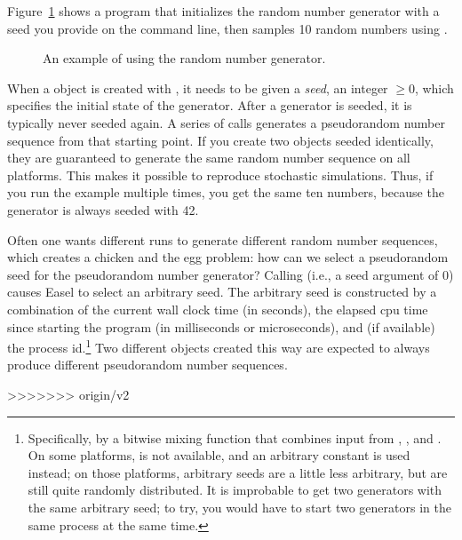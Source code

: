 Figure~\ref{fig:random_example} shows a program that initializes the
random number generator with a seed you provide on the command line,
then samples 10 random numbers using .

\begin{figure}

\caption{An example of using the random number generator.}
\label{fig:random_example}
\end{figure}

When a  object is created with
, it needs to be given a \emph{seed},
an integer $\geq 0$, which specifies the initial state of the
generator. After a generator is seeded, it is typically never seeded
again. A series of  calls generates a
pseudorandom number sequence from that starting point. If you create
two  objects seeded identically, they are
guaranteed to generate the same random number sequence on all
platforms. This makes it possible to reproduce stochastic simulations.
Thus, if you run the example multiple times, you get the same ten
numbers, because the generator is always seeded with 42.

Often one wants different runs to generate different random number
sequences, which creates a chicken and the egg problem: how can we
select a pseudorandom seed for the pseudorandom number generator?
Calling  (i.e., a seed argument of
0) causes Easel to select an arbitrary seed. The arbitrary seed is
constructed by a combination of the current wall clock time (in
seconds), the elapsed cpu time since starting the program (in
milliseconds or microseconds), and (if available) the process
id.\footnote{Specifically, by a bitwise mixing function that combines
  input from , , and . On
  some platforms,  is not available, and an arbitrary
  constant is used instead; on those platforms, arbitrary seeds are a
  little less arbitrary, but are still quite randomly distributed.  It
  is improbable to get two generators with the same arbitrary seed; to
  try, you would have to start two generators in the same process at
  the same time.} Two different  objects
created this way are expected to always produce different pseudorandom
number sequences.


>>>>>>> origin/v2
